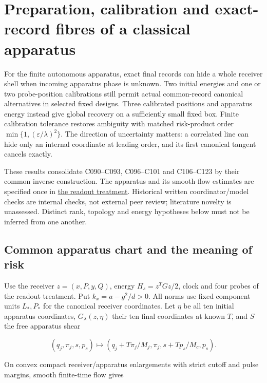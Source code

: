 \documentclass[11pt,a4paper]{article}
\begin{document}
\hypertarget{preparation-calibration-and-exact-record-fibres-of-a-classical-apparatus}{%
\section{Preparation, calibration and exact-record fibres of a classical
apparatus}\label{preparation-calibration-and-exact-record-fibres-of-a-classical-apparatus}}

For the finite autonomous apparatus, exact final records can hide a
whole receiver shell when incoming apparatus phase is unknown. Two
initial energies and one or two probe-position calibrations still permit
actual common-record canonical alternatives in selected fixed designs.
Three calibrated positions and apparatus energy instead give global
recovery on a sufficiently small fixed box. Finite calibration tolerance
restores ambiguity with matched risk-product order
\(\min\{1,(\varepsilon/\lambda)^2\}\). The direction of uncertainty
matters: a correlated line can hide only an internal coordinate at
leading order, and its first canonical tangent cancels exactly.

These results consolidate C090--C093, C096--C101 and C106--C123 by their
common inverse construction. The apparatus and its smooth-flow estimates
are specified once in \href{autonomous-finite-readout.md}{the readout
treatment}. Historical written coordinator/model checks are internal
checks, not external peer review; literature novelty is unassessed.
Distinct rank, topology and energy hypotheses below must not be inferred
from one another.

\hypertarget{common-apparatus-chart-and-the-meaning-of-risk}{%
\subsection{Common apparatus chart and the meaning of
risk}\label{common-apparatus-chart-and-the-meaning-of-risk}}

Use the receiver \(z=(x,P,y,Q)\), energy \(H_s=z^TGz/2\), clock and four
probes of the readout treatment. Put \(k_x=a-g^2/d>0\). All norms use
fixed component units \(L_*,P_*\) for the canonical receiver
coordinates. Let \(\eta\) be all ten initial apparatus coordinates,
\(G_\lambda(z,\eta)\) their ten final coordinates at known \(T\), and
\(S\) the free apparatus shear

\[(q_j,\pi_j,s,p_s)\mapsto
(q_j+T\pi_j/M_j,\pi_j,s+Tp_s/M_c,p_s).\]

On convex compact receiver/apparatus enlargements with strict cutoff and
pulse margins, smooth finite-time flow gives
\end{document}
